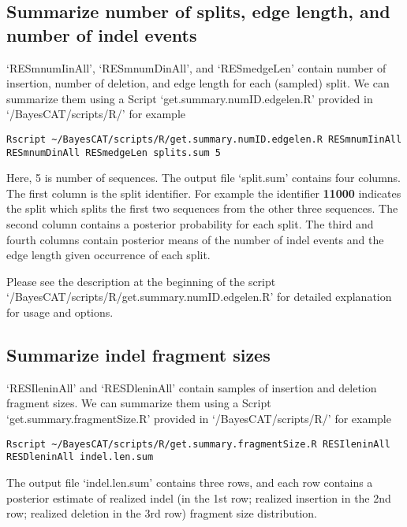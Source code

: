 \documentclass[11pt]{article}
\begin{document}
\subsection{Summarize number of splits, edge length, and number of indel events}
\label{sec-5-3}
`RESmnumIinAll', `RESmnumDinAll', and `RESmedgeLen' contain number of insertion, number of deletion, and edge length for each (sampled) split. We can summarize them using a Script `get.summary.numID.edgelen.R' provided in `/BayesCAT/scripts/R/' for example
\begin{lstlisting}
Rscript ~/BayesCAT/scripts/R/get.summary.numID.edgelen.R RESmnumIinAll RESmnumDinAll RESmedgeLen splits.sum 5
\end{lstlisting}
Here, 5 is number of sequences. The output file `split.sum' contains four columns. The first column is the split identifier. For example the identifier \textbf{11000} indicates the split which splits the first two sequences from the other three sequences. The second column contains a posterior probability for each split. The third and fourth columns contain posterior means of the number of indel events and the edge length given occurrence of each split.

Please see the description at the beginning of the script `/BayesCAT/scripts/R/get.summary.numID.edgelen.R' for detailed explanation for usage and options.

\subsection{Summarize indel fragment sizes}
\label{sec-5-4}
`RESIleninAll' and `RESDleninAll' contain samples of insertion and deletion fragment sizes. We can summarize them using a Script `get.summary.fragmentSize.R' provided in `/BayesCAT/scripts/R/' for example
\begin{lstlisting}
Rscript ~/BayesCAT/scripts/R/get.summary.fragmentSize.R RESIleninAll RESDleninAll indel.len.sum
\end{lstlisting}
The output file `indel.len.sum' contains three rows, and each row contains a posterior estimate of realized indel (in the 1st row; realized insertion in the 2nd row; realized deletion in the 3rd row) fragment size distribution.
\end{document}
